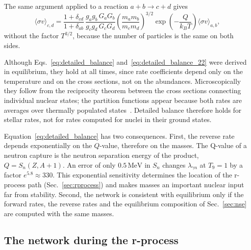 The same argument applied to a reaction $a+b\to c+d$ gives
\begin{equation}\label{eq:detailed_balance_22}
  \langle\sigma v\rangle_{c,d}=\frac{1+\delta_{cd}}{1+\delta_{ab}}\,\frac{g_ag_b\,G_aG_b}{g_cg_d\,G_cG_d}\left(\frac{m_am_b}{m_cm_d}\right)^{3/2}\exp\left(-\frac{Q}{k_BT}\right)\langle\sigma v\rangle_{a,b},
\end{equation}
without the factor $T^{3/2}$, because the number of particles is the same on both sides.

Although Eqs.~\ref{eq:detailed_balance} and~\ref{eq:detailed_balance_22} were derived in equilibrium, they hold at all times, since rate coefficients depend only on the temperature and on the cross sections, not on the abundances.
Microscopically they follow from the reciprocity theorem between the cross sections connecting individual nuclear states; the partition functions appear because both rates are averages over thermally populated states~\cite{fowler_thermonuclear_1967,rauscher_astrophysical_2000}.
Detailed balance therefore holds for stellar rates, not for rates computed for nuclei in their ground states.

Equation~\ref{eq:detailed_balance} has two consequences.
First, the reverse rate depends exponentially on the $Q$-value, therefore on the masses.
The Q-value of a neutron capture is the neutron separation energy of the product, $Q=S_n(Z,A+1)$.
An error of only $0.5\,\mathrm{MeV}$ in $S_n$ changes $\lambda_{\gamma n}$ at $T_9=1$ by a factor $e^{5.8}\approx330$.
This exponential sensitivity determines the location of the r-process path (Sec.~\ref{sec:rprocess}) and makes masses an important nuclear input far from stability.
Second, the network is consistent with equilibrium only if the forward rates, the reverse rates and the equilibrium composition of Sec.~\ref{sec:nse} are computed with the same masses.

\subsection{The network during the r-process}\label{sec:network_rprocess}

